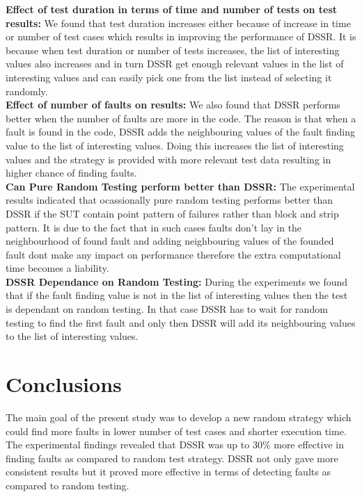\documentclass[10pt, conference, compsocconf]{IEEEtran}
\begin{document}
\textbf{Effect of test duration in terms of time and number of tests on test results:} 
We found that test duration increases either because of  increase in time or number of test cases which results in improving the performance of DSSR. It is because when test duration or number of tests increases, the list of interesting values also increases and in turn DSSR get enough relevant values in the list of interesting values and can easily pick one from the list instead of selecting it randomly.\\

\textbf{Effect of number of faults on results:} 
We also found that DSSR performs better when the number of faults are more in the code. The reason is that when a fault is found in the code, DSSR adds the neighbouring values of the fault finding value to the list of interesting values. Doing this increases the list of interesting values and the strategy is provided with more relevant test data resulting in higher chance of finding faults.\\

\textbf{Can Pure Random Testing perform better than DSSR:}
The experimental results indicated that ocassionally pure random testing performs better than DSSR if the SUT contain point pattern of failures rather than block and strip pattern. It is due to the fact that in such cases faults don't lay in the neighbourhood of found fault and adding neighbouring values of the founded fault dont make any impact on performance therefore the extra computational time becomes a liability.\\

\textbf{DSSR Dependance on Random Testing:}
During the experiments we found that if the fault finding value is not in the list of interesting values then the test is dependant on random testing. In that case DSSR has to wait for random testing to find the first fault and only then DSSR will add its neighbouring values to the list of interesting values.


\section{Conclusions}\label{sec:conc}

The main goal of the present study was to develop a new random strategy which could find more faults in lower number of test cases and shorter execution time. The experimental findings revealed that DSSR was up to 30\% more effective in finding faults as compared to random test strategy. DSSR not only gave more consistent results but it proved more effective in terms of detecting faults as compared to random testing. \\
\end{document}
